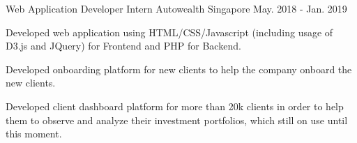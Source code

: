 \begin{cventries}
  \cventry
    {Web Application Developer Intern} %
    {Autowealth} %
    {Singapore} %
    {May. 2018 - Jan. 2019} %
    {
      \begin{cvitems} %
        \item {Developed web application using HTML/CSS/Javascript (including usage of D3.js and JQuery) for Frontend and PHP for Backend.}
        \item {Developed onboarding platform for new clients to help the company onboard the new clients.}
        \item {Developed client dashboard platform for more than 20k clients in order to help them to observe and analyze their investment portfolios, which still on use until this moment.}
      \end{cvitems}
    }

\end{cventries}
